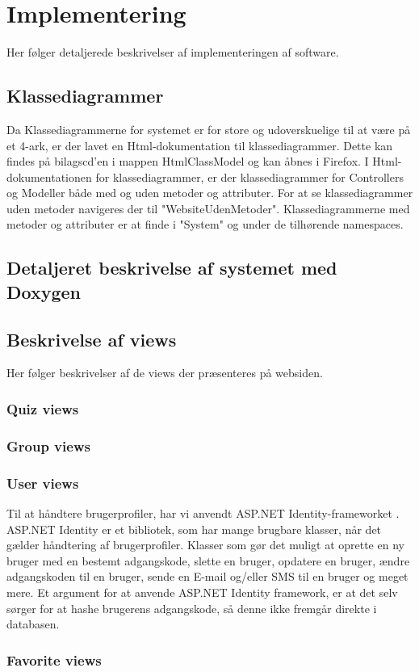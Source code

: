 \chapter{Implementering}

Her følger detaljerede beskrivelser af implementeringen af software.

\section{Klassediagrammer}
Da Klassediagrammerne for systemet er for store og udoverskuelige til at være på et 4-ark, er der lavet en Html-dokumentation til klassediagrammer. Dette kan findes på bilagscd'en i mappen HtmlClassModel og kan åbnes i Firefox. I Html-dokumentationen for klassediagrammer, er der klassediagrammer for Controllers og Modeller både med og uden metoder og attributer. For at se klassediagrammer uden metoder navigeres der til "WebsiteUdenMetoder". Klassediagrammerne med metoder og attributer er at finde i "System" og under de tilhørende namespaces.

\section{Detaljeret beskrivelse af systemet med Doxygen}


\section{Beskrivelse af views}\label{sec:views}
Her følger beskrivelser af de views der præsenteres på websiden.
\subsection{Quiz views}





\subsection{Group views}




\subsection{User views}
Til at håndtere brugerprofiler, har vi anvendt ASP.NET Identity-frameworket \citep{msdnIdentityFrameworkWeb}. ASP.NET Identity er et bibliotek, som har mange brugbare klasser, når det gælder håndtering af brugerprofiler. Klasser som gør det muligt at oprette en ny bruger med en bestemt adgangskode, slette en bruger, opdatere en bruger, ændre adgangskoden til en bruger, sende en E-mail og/eller SMS til en bruger og meget mere. Et argument for at anvende ASP.NET Identity framework, er at det selv sørger for at hashe brugerens adgangskode, så denne ikke fremgår direkte i databasen.



\subsection{Favorite views}


